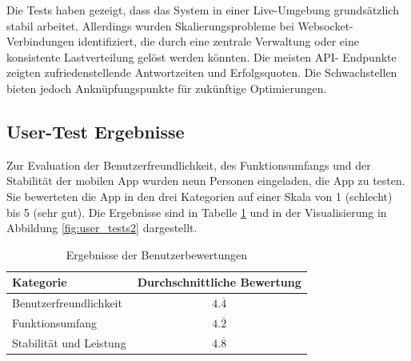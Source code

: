 Die Tests haben gezeigt, dass das System in einer Live-Umgebung grundsätzlich stabil arbeitet. 
Allerdings wurden Skalierungsprobleme bei Websocket-Verbindungen identifiziert, die durch eine 
zentrale Verwaltung oder eine konsistente Lastverteilung gelöst werden könnten. Die meisten API-
Endpunkte zeigten zufriedenstellende Antwortzeiten und Erfolgsquoten. Die Schwachstellen bieten 
jedoch Anknüpfungspunkte für zukünftige Optimierungen.

\subsection{User-Test Ergebnisse}

Zur Evaluation der Benutzerfreundlichkeit, des Funktionsumfangs und der Stabilität der mobilen App 
wurden neun Personen eingeladen, die App zu testen. Sie bewerteten die App in den drei Kategorien 
auf einer Skala von 1 (schlecht) bis 5 (sehr gut). Die Ergebnisse sind in Tabelle 
\ref{tab:user_tests} und in der Visualisierung in Abbildung \ref{fig:user_tests2} dargestellt.

\begin{table}[h!]
    \centering
    \renewcommand{\arraystretch}{1.2} %
    \begin{tabular}{|l|c|}
        \hline
        \textbf{Kategorie} & \textbf{Durchschnittliche Bewertung} \\
        \hline
        Benutzerfreundlichkeit & $4.\overline{4}$ \\
        Funktionsumfang & $4.\overline{2}$ \\
        Stabilität und Leistung & $4.\overline{8}$ \\
        \hline
    \end{tabular}
    \renewcommand{\arraystretch}{1.0} %
    \caption{Ergebnisse der Benutzerbewertungen}
    \label{tab:user_tests}
\end{table}


